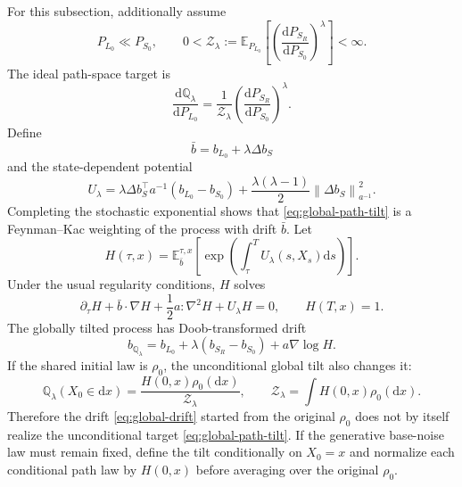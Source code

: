 \documentclass[11pt,a4paper]{article}
\newcommand{\E}{\mathbb{E}}
\newcommand{\norm}[1]{\left\lVert #1 \right\rVert}
\newcommand{\dd}{\mathrm{d}}
\newcommand{\Sbase}{S_0}
\newcommand{\Srl}{S_R}
\newcommand{\Lbase}{L_0}
\newcommand{\dbS}{\Delta b_S}
\theoremstyle{plain}
\theoremstyle{definition}
\begin{document}
For this subsection, additionally assume
\begin{equation}
P_{\Lbase}\ll P_{\Sbase},
\qquad
0<\mathcal Z_\lambda
:=
\E_{P_{\Lbase}}
\left[
\left(
\frac{\dd P_{\Srl}}{\dd P_{\Sbase}}
\right)^\lambda
\right]
<\infty .
\label{eq:path-tilt-assumptions}
\end{equation}
The ideal path-space target is
\begin{equation}
\frac{\dd\mathbb Q_\lambda}{\dd P_{\Lbase}}
=
\frac1{\mathcal Z_\lambda}
\left(
\frac{\dd P_{\Srl}}{\dd P_{\Sbase}}
\right)^\lambda.
\label{eq:global-path-tilt}
\end{equation}
Define
\begin{equation}
\bar b=b_{\Lbase}+\lambda\dbS
\label{eq:myopic-drift}
\end{equation}
and the state-dependent potential
\begin{equation}
U_\lambda
=
\lambda\dbS^\top a^{-1}(b_{\Lbase}-b_{\Sbase})
+\frac{\lambda(\lambda-1)}2
\norm{\dbS}_{a^{-1}}^2.
\label{eq:path-potential}
\end{equation}
Completing the stochastic exponential shows that
\eqref{eq:global-path-tilt} is a Feynman--Kac weighting of the process with drift $\bar b$.
Let
\begin{equation}
H(\tau,x)
=
\E_{\bar b}^{\tau,x}
\left[
\exp\left(
\int_\tau^T U_\lambda(s,X_s)\dd s
\right)
\right].
\label{eq:desirability}
\end{equation}
Under the usual regularity conditions, $H$ solves
\begin{equation}
\partial_\tau H
+\bar b\cdot\nabla H
+\frac12a:\nabla^2H
+U_\lambda H
=0,
\qquad
H(T,x)=1.
\label{eq:desirability-pde}
\end{equation}
The globally tilted process has Doob-transformed drift
\begin{equation}
\boxed{
b_{\mathbb Q_\lambda}
=
b_{\Lbase}
+\lambda(b_{\Srl}-b_{\Sbase})
+a\nabla\log H.
}
\label{eq:global-drift}
\end{equation}
If the shared initial law is $\rho_0$, the unconditional global tilt also changes it:
\begin{equation}
\mathbb Q_\lambda(X_0\in\dd x)
=
\frac{H(0,x)\rho_0(\dd x)}{\mathcal Z_\lambda},
\qquad
\mathcal Z_\lambda
=
\int H(0,x)\rho_0(\dd x).
\label{eq:tilted-initial-law}
\end{equation}
Therefore the drift \eqref{eq:global-drift} started from the original $\rho_0$ does not by itself
realize the unconditional target \eqref{eq:global-path-tilt}.  If the generative base-noise law
must remain fixed, define the tilt conditionally on $X_0=x$ and normalize each conditional path
law by $H(0,x)$ before averaging over the original $\rho_0$.
\end{document}
